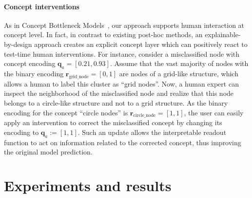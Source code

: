 \paragraph{Concept interventions}
As in Concept Bottleneck Models~\citep{koh2020concept}, our approach supports human interaction at concept level. In fact, in contrast to existing post-hoc methods, an explainable-by-design approach creates an explicit concept layer which can positively react to test-time human interventions. For instance, consider a misclassified node with concept encoding $\mathbf{q}_a = [0.21, 0.93]$. Assume that the vast majority of nodes with the binary encoding $\mathbf{r}_{\text{grid\_node}} = [0, 1]$ are nodes of a grid-like structure, which allows a human to label this cluster as ``grid nodes''. Now, a human expert can inspect the neighborhood of the misclassified node and realize that this node belongs to a circle-like structure and not to a grid structure. As the binary encoding for the concept ``circle nodes'' is $\mathbf{r}_{\text{circle\_node}} = [1, 1]$, the user can easily apply an intervention to correct the misclassified concept by changing its encoding to $\mathbf{q}_a:=[1, 1]$. Such an update allows the interpretable readout function to act on information related to the corrected concept, thus improving the original model prediction.

\section{Experiments and results}

